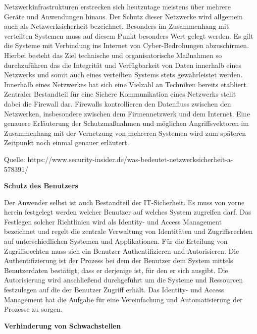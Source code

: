Netzwerkinfrastrukturen erstrecken sich heutzutage meistens über mehrere Geräte und Anwendungen hinaus. Der Schutz dieser 
Netzwerke wird allgemein auch als Netzwerksicherheit bezeichnet. Besonders im Zusammenhang mit verteilten Systemen muss auf diesem Punkt besonders Wert gelegt werden.
Es gilt die Systeme mit Verbindung ins Internet von Cyber-Bedrohungen abzuschirmen. Hierbei besteht das Ziel technische und organisatorische 
Maßnahmen so durchzuführen das die Integrität und Verfügbarkeit von Daten innerhalb eines Netzwerks und somit auch eines verteilten Systems stets gewährleistet werden. 
Innerhalb eines Netzwerkes hat sich eine Vielzahl an Techniken bereits etabliert. 
Zentraler Bestandteil für eine Sichere Kommunikation eines Netzwerks stellt dabei die Firewall dar. Firewalls kontrollieren den Datenfluss zwischen den 
Netzwerken, insbesondere zwischen dem Firmennetzwerk und dem Internet. Eine genauere Erläuterung der Schutzmaßnahmen und möglichen Angriffsvektoren im Zusammenhang mit 
der Vernetzung von mehreren Systemen wird zum späteren Zeitpunkt noch einmal genauer erläutert. 

Quelle: https://www.security-insider.de/was-bedeutet-netzwerksicherheit-a-578391/

\textbf{Schutz des Benutzers}\label{Schutz_des_Benutzers}

Der Anwender selbst ist auch Bestandteil der IT-Sicherheit. Es muss von vorne herein festgelegt werden welcher Benutzer auf welches System zugreifen darf. 
Das Festlegen solcher Richtlinien wird als \glqq Identity- und Access Management \grqq{} bezeichnet und regelt die zentrale Verwaltung von Identitäten und Zugriffsrechten auf unterschiedlichen
Systemen und Applikationen. Für die Erteilung von Zugriffsrechten muss sich ein Benutzer Authentifizieren und Autorisieren. 
Die Authentifizierung ist der Prozess bei dem der Benutzer dem System mittels Benutzerdaten bestätigt, dass er derjenige ist, für den er sich ausgibt. Die Autorisierung 
wird anschließend durchgeführt um die Systeme und Ressourcen festzulegen auf die der Benutzer Zugriff erhält. Das Identity- und Access Management hat die 
Aufgabe für eine Vereinfachung und Automatisierung der Prozesse zu sorgen. 

\textbf{Verhinderung von Schwachstellen}

